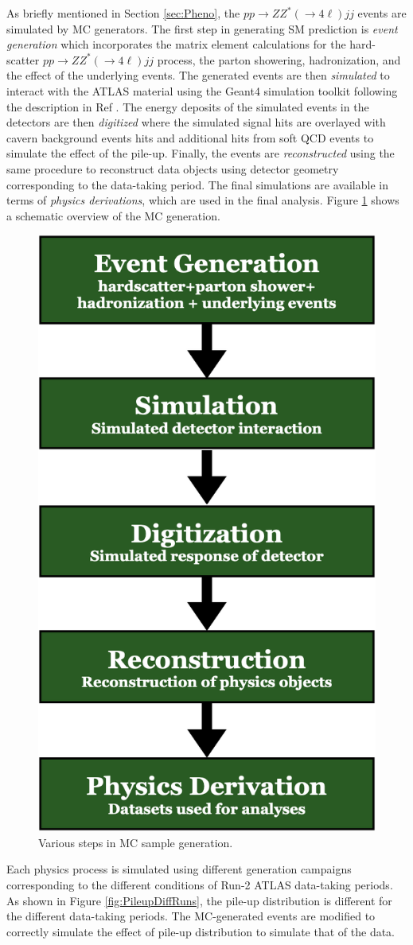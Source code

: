 As briefly mentioned in Section \ref{sec:Pheno}, the $pp \rightarrow ZZ^* (\rightarrow 4\ell) jj$ events are simulated by MC generators. The first step in generating SM prediction is \textit{event generation} which incorporates the matrix element calculations for the hard-scatter $pp \rightarrow ZZ^* (\rightarrow 4\ell) jj$ process, the parton showering, hadronization, and the effect of the underlying events. The generated events are then \textit{simulated} to interact with the ATLAS material using the Geant4 simulation toolkit following the description in Ref \cite{GEANT4}. The energy deposits of the simulated events in the detectors are then \textit{digitized} where the simulated signal hits are overlayed with cavern background events hits and additional hits from soft QCD events to simulate the effect of the pile-up. Finally, the events are \textit{reconstructed} using the same procedure to reconstruct data objects using detector geometry corresponding to the data-taking period. The final simulations are available in terms of \textit{physics derivations}, which are used in the final analysis. Figure \ref{fig:MCGenerationSchematic} shows a schematic overview of the MC generation. 
\begin{figure}[!htb]
\centering
\includegraphics[width=.3\linewidth]{figures/AnalysisOverview/MCSchematic.png}  
  \caption{Various steps in MC sample generation.}
\label{fig:MCGenerationSchematic}
\end{figure}

Each physics process is simulated using different generation campaigns corresponding to the different conditions of Run-2 ATLAS data-taking periods. As shown in Figure \ref{fig:PileupDiffRuns}, the pile-up distribution is different for the different data-taking periods. The MC-generated events are modified to correctly simulate the effect of pile-up distribution to simulate that of the data. 

